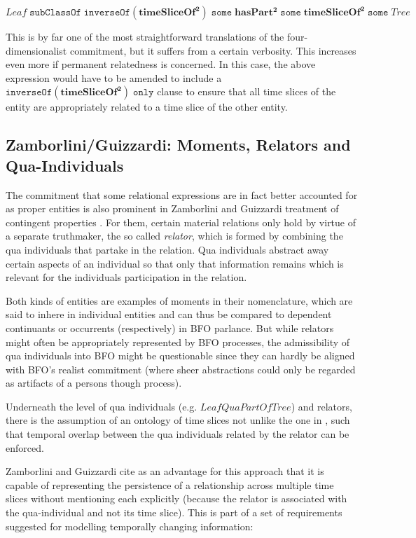 \documentclass[10pt]{bmc_article}
\newcommand{\mirel}[1]{\ensuremath{\mathrm{\mathbf{#1}}}}
\newcommand{\mclass}[1]{\ensuremath{\mathit{#1}}}
\newcommand{\mrel}[2]{\mirel{#1^#2}}
\newcommand{\mrelb}[1]{\mrel{#1}{2}}
\newenvironment{bmcformat}{\baselineskip20pt\sloppy\setboolean{publ}{false}}{\baselineskip20pt\sloppy}
\begin{document}
\begin{bmcformat}
\begin{equation}
\mclass{Leaf}\;\mathtt{subClassOf}\;\mathtt{inverseOf}(\mrelb{timeSliceOf})\;\mathtt{some}\;
            \mrelb{hasPart}\;\mathtt{some}\;\mrelb{timeSliceOf}\;\mathtt{some}\;\mclass{Tree}
\label{eq:fifteen}
\end{equation}

This is by far one of the most straightforward translations of the
four-dimensionalist commitment, but it suffers from a certain verbosity. This
increases even more if permanent relatedness is concerned. In this case, the
above expression would have to be amended to include a
$\mathtt{inverseOf}(\mrelb{timeSliceOf})\;\mathtt{only}$ clause to ensure that
all time slices of the entity are appropriately related to a time slice of the
other entity.

\subsection*{Zamborlini/Guizzardi: Moments, Relators and Qua-Individuals}
The commitment that some relational expressions are in fact better accounted for
as proper entities is also prominent in Zamborlini and Guizzardi treatment of 
contingent properties \cite{Zamborlini:Guizzardi}. For them, certain material
relations only hold by virtue of a separate truthmaker, the so called
\emph{relator}, which is formed by combining the qua individuals that
partake in the relation. Qua individuals abstract away certain aspects of an
individual so that only that information remains which is relevant for the
individuals participation in the relation. 

Both kinds of entities are examples of moments in their
nomenclature, which are said to inhere in individual entities and can thus be
compared to dependent continuants or occurrents (respectively) in BFO
parlance. But while relators might often be appropriately represented by BFO
processes, the admissibility of qua individuals into BFO might be questionable
since they can hardly be aligned with BFO's realist commitment (where sheer
abstractions could only be regarded as artifacts of a persons though process). 

Underneath the level of qua individuals (e.g. $\mclass{LeafQuaPartOfTree}$)
and relators, there is the assumption of an ontology of time slices not unlike
the one in \cite{Welty:2006}, such that
temporal overlap between the qua individuals related by the relator can be
enforced.

Zamborlini and Guizzardi cite as an advantage for this approach that it is capable
of representing the persistence of a relationship across multiple time slices
without mentioning each explicitly (because the relator is associated with the
qua-individual and not its time slice). This is part of a set of requirements
suggested for modelling temporally changing information:


\end{bmcformat}
\end{document}
